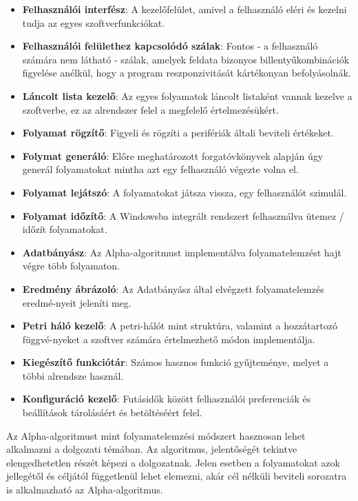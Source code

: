 \begin{itemize}
	\item \textbf{Felhasználói interfész}: A kezelőfelület, amivel a felhasználó eléri és kezelni tudja az egyes szoftverfunkciókat.
	\item \textbf{Felhasználói felülethez kapcsolódó szálak}:  Fontos - a felhasználó számára nem látható - szálak, amelyek feldata bizonyos billentyűkombinációk figyelése anélkül, hogy a program reszponzivitását kártékonyan befolyásolnák.
	\item \textbf{Láncolt lista kezelő}: Az egyes folyamatok láncolt listaként vannak kezelve a szoftverbe, ez az alrendszer felel a megfelelő értelmezésükért. 
	\item \textbf{Folyamat rögzítő}: Figyeli és rögzíti a perifériák általi beviteli értékeket.
	\item \textbf{Folymat generáló}: Előre meghatározott forgatóvkönyvek alapján úgy generál folyamatokat mintha azt egy felhasználó végezte volna el.
	\item \textbf{Folyamat lejátszó}: A folyamatokat játsza vissza, egy felhasználót szimulál.
	\item \textbf{Folyamat időzítő}: A Windowsba integrált rendszert felhasználva ütemez / időzít folyamatokat.
	\item \textbf{Adatbányász}: Az Alpha-algoritmust implementálva folyamatelemzést hajt végre több folyamaton.
	\item \textbf{Eredmény ábrázoló}: Az Adatbányász által elvégzett folyamatelemzés eredmé\hyp{}nyeit jeleníti meg.
	\item \textbf{Petri háló kezelő}: A petri-hálót mint struktúra, valamint a hozzátartozó függvé\hyp{}nyeket a szoftver számára értelmezhető módon implementálja.
	\item \textbf{Kiegészítő funkciótár}: Számos hasznos funkció gyűjteménye, melyet a többi alrendsze használ.
	\item \textbf{Konfiguráció kezelő}:  Futásidők között felhasználói preferenciák és beállítások tárolásáért és betöltéséért felel.
\end{itemize}


Az Alpha-algoritmust mint folyamatelemzési módszert hasznosan lehet alkalmazni a dolgozati témában. Az algoritmus, jelentőségét tekintve elengedhetetlen részét képezi a dolgozatnak. Jelen esetben a folyamatokat azok jellegétől és céljától függetlenül lehet elemezni, akár cél nélküli beviteli sorozatra is alkalmazható az Alpha-algoritmus.

